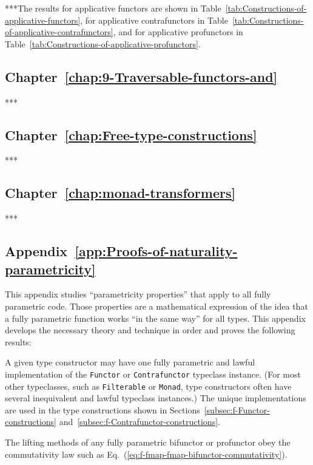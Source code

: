 {*}{*}{*}The results for applicative functors are shown in Table~\ref{tab:Constructions-of-applicative-functors},
for applicative contrafunctors in Table~\ref{tab:Constructions-of-applicative-contrafunctors},
and for applicative profunctors in Table~\ref{tab:Constructions-of-applicative-profunctors}.

\subsection{Chapter~\ref{chap:9-Traversable-functors-and}}

{*}{*}{*}

\subsection{Chapter~\ref{chap:Free-type-constructions}}

{*}{*}{*}

\subsection{Chapter~\ref{chap:monad-transformers}}

{*}{*}{*}

\subsection{Appendix~\ref{app:Proofs-of-naturality-parametricity}}

This appendix studies \textsf{``}parametricity properties\textsf{''} that apply to
all fully parametric code. Those properties are a mathematical expression
of the idea that a fully parametric function works \textsf{``}in the same
way\textsf{''} for all types. This appendix develops the necessary theory
and technique in order and proves the following results:

A given type constructor may have one fully parametric and lawful
implementation of the \lstinline!Functor! or \lstinline!Contrafunctor!
typeclass instance. (For most other typeclasses, such as \lstinline!Filterable!
or \lstinline!Monad!, type constructors often have several inequivalent
and lawful typeclass instances.) The unique implementations are used
in the type constructions shown in Sections~\ref{subsec:f-Functor-constructions}
and~\ref{subsec:f-Contrafunctor-constructions}.

The lifting methods of any fully parametric bifunctor or profunctor
obey the commutativity law such as Eq.~(\ref{eq:f-fmap-fmap-bifunctor-commutativity}). 

